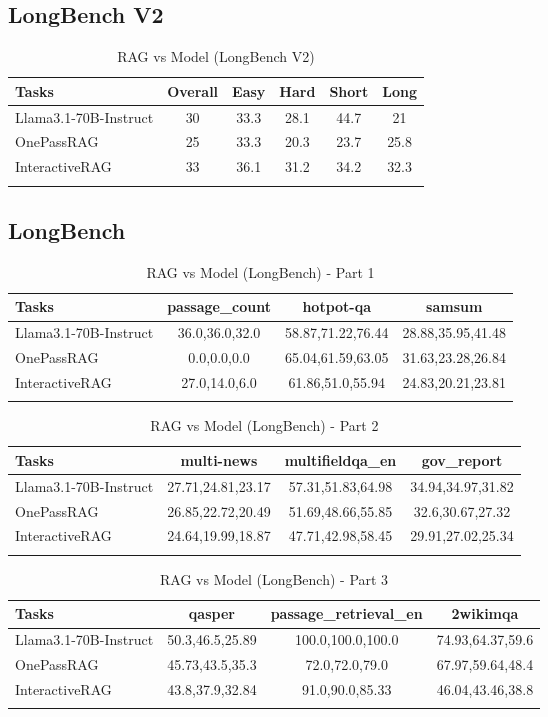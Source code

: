 \subsection{LongBench V2}
\begin{longtable}{l|c|c c c c}
\hline
\textbf{Tasks} & \textbf{Overall} & \textbf{Easy} & \textbf{Hard} & \textbf{Short} & \textbf{Long} \\
\hline
\endhead
Llama3.1-70B-Instruct & 30 & 33.3 & 28.1 & 44.7 & 21 \\
OnePassRAG  & 25 & 33.3 & 20.3 & 23.7 & 25.8 \\
InteractiveRAG  & 33 & 36.1 & 31.2 & 34.2 & 32.3 \\
\hline
\caption{RAG vs Model (LongBench V2)}
\label{tab:rag_performance_longbenchv2}
\end{longtable}

\subsection{LongBench}

\begin{longtable}{l|c c c}
\hline
\textbf{Tasks} & \textbf{passage\_count} & \textbf{hotpot-qa} & \textbf{samsum} \\
\hline \endhead
Llama3.1-70B-Instruct & 36.0,36.0,32.0 & 58.87,71.22,76.44 & 28.88,35.95,41.48 \\
OnePassRAG  & 0.0,0.0,0.0 & 65.04,61.59,63.05 & 31.63,23.28,26.84 \\
InteractiveRAG  & 27.0,14.0,6.0 & 61.86,51.0,55.94 & 24.83,20.21,23.81 \\
\hline
\caption{RAG vs Model (LongBench) - Part 1}
\label{tab:longbench_part1}
\end{longtable}

\begin{longtable}{l|c c c}
\hline
\textbf{Tasks} & \textbf{multi-news} & \textbf{multifieldqa\_en} & \textbf{gov\_report} \\
\hline \endhead
Llama3.1-70B-Instruct & 27.71,24.81,23.17 & 57.31,51.83,64.98 & 34.94,34.97,31.82 \\
OnePassRAG  & 26.85,22.72,20.49 & 51.69,48.66,55.85 & 32.6,30.67,27.32 \\
InteractiveRAG  & 24.64,19.99,18.87 & 47.71,42.98,58.45 & 29.91,27.02,25.34 \\
\hline
\caption{RAG vs Model (LongBench) - Part 2}
\label{tab:longbench_part2}
\end{longtable}

\begin{longtable}{l|c c c}
\hline
\textbf{Tasks} & \textbf{qasper} & \textbf{passage\_retrieval\_en} & \textbf{2wikimqa} \\
\hline \endhead
Llama3.1-70B-Instruct & 50.3,46.5,25.89 & 100.0,100.0,100.0 & 74.93,64.37,59.6 \\
OnePassRAG  & 45.73,43.5,35.3 & 72.0,72.0,79.0 & 67.97,59.64,48.4 \\
InteractiveRAG  & 43.8,37.9,32.84 & 91.0,90.0,85.33 & 46.04,43.46,38.8 \\
\hline
\caption{RAG vs Model (LongBench) - Part 3}
\label{tab:longbench_part3}
\end{longtable}

